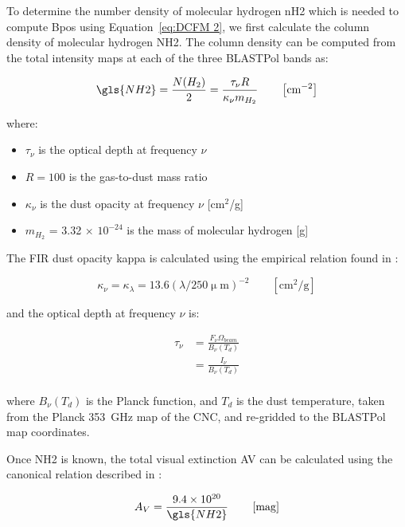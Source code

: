 To determine the number density of molecular hydrogen \gls{nH2} which is needed to compute \gls{Bpos} using Equation~\ref{eq:DCFM 2}, we first calculate the column density of molecular hydrogen \gls{NH2}. The column density can be computed from the total intensity maps at each of the three BLASTPol bands as:

\begin{equation}\label{eq:NH2}
  \gls{NH2} = \frac{N(H_{2})}{2} = \frac{ \tau_{\nu} R}{\kappa_{\nu} m_{H_2}} \qquad \left[ \text{cm}^{-2} \right]
\end{equation}

where:
\begin{itemize}[label={},nosep]
  \item $\tau_{\nu}$ is the optical depth at frequency $\nu$
  \item $R = 100$ is the gas-to-dust mass ratio
  \item $\kappa_{\nu}$ is the dust opacity at frequency $\nu$ [cm$^{2}$/g]
  \item $m_{H_2}$ = 3.32 $\times$ $10^{-24}$ is the mass of molecular hydrogen [g]
\end{itemize}

The FIR dust opacity \gls{kappa} is calculated using the empirical relation found in \citet{mathis1990interstellar}:

\begin{equation}\label{eq:kappa}
  \kappa_{\nu} = \kappa_{\lambda} = 13.6 (\lambda / 250 \mathrm{\upmu m})^{-2} \qquad \left[ \mathrm{cm}^{2}/\mathrm{g} \right]
\end{equation}

and the optical depth at frequency $\nu$ is:

\begin{align}\label{eq:tau}
  \tau_{\nu} &= \frac{F_{\nu}\Omega_{beam}}{B_{\nu}(T_{d})} \\
          &= \frac{I_{\nu}}{B_{\nu}(T_{d})} \\
\end{align}

where $B_{\nu}(T_{d})$ is the Planck function, and $T_{d}$ is the dust temperature, taken from the Planck 353~GHz map of the CNC, and re-gridded to the BLASTPol map coordinates.

Once \gls{NH2} is known, the total visual extinction \gls{AV} can be calculated using the canonical relation described in \citet{bohlin224savage}:

\begin{equation}\label{eq:Av}
A_{V} = \frac{ 9.4 \times 10^{20}}{\gls{NH2}} \qquad \left[ \mathrm{mag} \right]
\end{equation}

